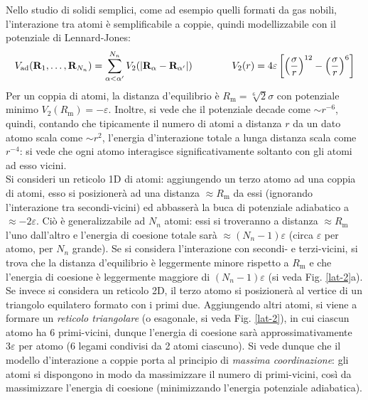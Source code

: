 Nello studio di solidi semplici, come ad esempio quelli formati da gas nobili, l'interazione tra atomi è semplificabile a coppie, quindi modellizzabile con il potenziale di Lennard-Jones:
\begin{equation}
	V_\text{ad}(\mathbf{R}_1 , \dots , \mathbf{R}_{N_n}) = \sum_{\alpha < \alpha'}^{N_n} V_2(\left\lvert\mathbf{R}_\alpha - \mathbf{R}_{\alpha'}\right\rvert)
	\qquad \qquad
	V_2(r) = 4\varepsilon \left[ \left( \frac{\sigma}{r} \right)^{12} - \left( \frac{\sigma}{r} \right)^6 \right]
\end{equation}
Per un coppia di atomi, la distanza d'equilibrio è $ R_\text{m} = \sqrt[6]{2} \sigma $ con potenziale minimo $ V_2(R_\text{m}) = -\varepsilon $. Inoltre, si vede che il potenziale decade come $ \sim r^{-6} $, quindi, contando che tipicamente il numero di atomi a distanza $ r $ da un dato atomo scala come $ \sim r^2 $, l'energia d'interazione totale a lunga distanza scala come $ r^{-4} $: si vede che ogni atomo interagisce significativamente soltanto con gli atomi ad esso vicini. \\
Si consideri un reticolo 1D di atomi: aggiungendo un terzo atomo ad una coppia di atomi, esso si posizionerà ad una distanza $ \approx R_\text{m} $ da essi (ignorando l'interazione tra secondi-vicini) ed abbasserà la buca di potenziale adiabatico a $ \approx -2\varepsilon $. Ciò è generalizzabile ad $ N_n $ atomi: essi si troveranno a distanza $ \approx R_\text{m} $ l'uno dall'altro e l'energia di coesione totale sarà $ \approx (N_n - 1) \varepsilon $ (circa $ \varepsilon $ per atomo, per $ N_n $ grande). Se si considera l'interazione con secondi- e terzi-vicini, si trova che la distanza d'equilibrio è leggermente minore rispetto a $ R_\text{m} $ e che l'energia di coesione è leggermente maggiore di $ (N_n - 1) \varepsilon $ (si veda Fig. \ref{lat-2}a). \\
Se invece si considera un reticolo 2D, il terzo atomo si posizionerà al vertice di un triangolo equilatero formato con i primi due. Aggiungendo altri atomi, si viene a formare un \textit{reticolo triangolare} (o esagonale, si veda Fig. \ref{lat-2}), in cui ciascun atomo ha 6 primi-vicini, dunque l'energia di coesione sarà approssimativamente $ 3\varepsilon $ per atomo (6 legami condivisi da 2 atomi ciascuno). Si vede dunque che il modello d'interazione a coppie porta al principio di \textit{massima coordinazione}: gli atomi si dispongono in modo da massimizzare il numero di primi-vicini, così da massimizzare l'energia di coesione (minimizzando l'energia potenziale adiabatica). \\
